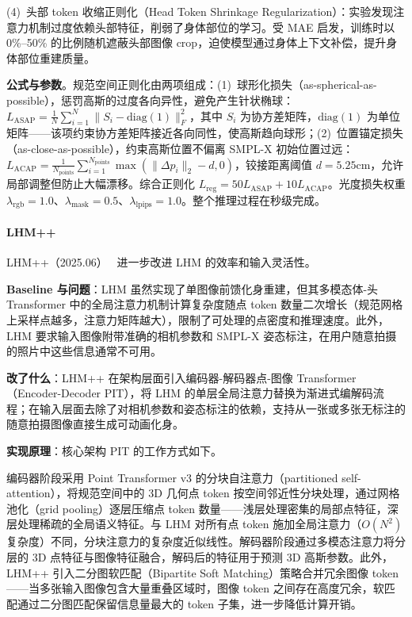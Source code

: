 (4)~头部 token 收缩正则化（Head Token Shrinkage Regularization）：实验发现注意力机制过度依赖头部特征，削弱了身体部位的学习。受 MAE 启发，训练时以 0\%--50\% 的比例随机遮蔽头部图像 crop，迫使模型通过身体上下文补偿，提升身体部位重建质量。

\textbf{公式与参数}。规范空间正则化由两项组成：(1)~球形化损失（as-spherical-as-possible），惩罚高斯的过度各向异性，避免产生针状椭球：$L_{\text{ASAP}} = \frac{1}{N}\sum_{i=1}^{N} \|S_i - \text{diag}(1)\|_F^2$，其中 $S_i$ 为协方差矩阵，$\text{diag}(1)$ 为单位矩阵——该项约束协方差矩阵接近各向同性，使高斯趋向球形；(2)~位置锚定损失（as-close-as-possible），约束高斯位置不偏离 SMPL-X 初始位置过远：$L_{\text{ACAP}} = \frac{1}{N_{\text{points}}}\sum_{i=1}^{N_{\text{points}}} \max(\|\Delta p_i\|_2 - d, 0)$，铰接距离阈值 $d = 5.25\text{cm}$，允许局部调整但防止大幅漂移。综合正则化 $L_{\text{reg}} = 50 L_{\text{ASAP}} + 10 L_{\text{ACAP}}$。光度损失权重 $\lambda_{\text{rgb}} = 1.0$、$\lambda_{\text{mask}} = 0.5$、$\lambda_{\text{lpips}} = 1.0$。整个推理过程在秒级完成。

\paragraph{LHM++}

LHM++（2025.06）~\cite{2506_13766} 进一步改进 LHM 的效率和输入灵活性。

\textbf{Baseline 与问题}：LHM 虽然实现了单图像前馈化身重建，但其多模态体-头 Transformer 中的全局注意力机制计算复杂度随点 token 数量二次增长（规范网格上采样点越多，注意力矩阵越大），限制了可处理的点密度和推理速度。此外，LHM 要求输入图像附带准确的相机参数和 SMPL-X 姿态标注，在用户随意拍摄的照片中这些信息通常不可用。

\textbf{改了什么}：LHM++ 在架构层面引入编码器-解码器点-图像 Transformer（Encoder-Decoder PIT），将 LHM 的单层全局注意力替换为渐进式编解码流程；在输入层面去除了对相机参数和姿态标注的依赖，支持从一张或多张无标注的随意拍摄图像直接生成可动画化身。

\textbf{实现原理}：核心架构 PIT 的工作方式如下。

编码器阶段采用 Point Transformer v3 的分块自注意力（partitioned self-attention），将规范空间中的 3D 几何点 token 按空间邻近性分块处理，通过网格池化（grid pooling）逐层压缩点 token 数量——浅层处理密集的局部点特征，深层处理稀疏的全局语义特征。与 LHM 对所有点 token 施加全局注意力（$O(N^2)$ 复杂度）不同，分块注意力的复杂度近似线性。解码器阶段通过多模态注意力将分层的 3D 点特征与图像特征融合，解码后的特征用于预测 3D 高斯参数。此外，LHM++ 引入二分图软匹配（Bipartite Soft Matching）策略合并冗余图像 token——当多张输入图像包含大量重叠区域时，图像 token 之间存在高度冗余，软匹配通过二分图匹配保留信息量最大的 token 子集，进一步降低计算开销。

